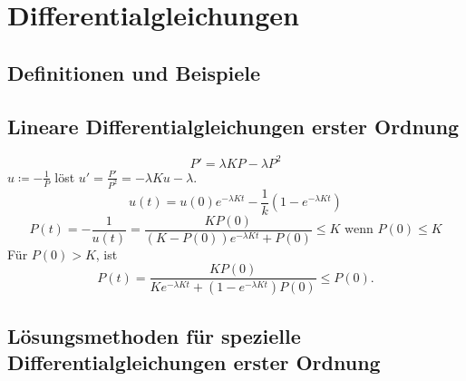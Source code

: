 \chapter{Differentialgleichungen}
\changesection
\section{Definitionen und Beispiele}
\section{Lineare Differentialgleichungen erster Ordnung}
\begin{beispiel*}
	\[ P'=\lambda KP-\lambda P^2 \]
	$ u\coloneqq-\frac{1}{P} $ l\"ost $ u'=\frac{P'}{P^2}=-\lambda Ku-\lambda $.
	\[ u(t)=u(0)e^{-\lambda Kt}-\frac{1}{k}\left(1-e^{-\lambda Kt}\right) \]
	\[ P(t)=-\frac{1}{u(t)}=\frac{KP(0)}{(K-P(0))e^{-\lambda Kt}+P(0)}\leq K\text{ wenn }P(0)\leq K \]
	F\"ur $ P(0)>K $, ist 
	\[ P(t)=\frac{KP(0)}{Ke^{-\lambda Kt}+(1-e^{-\lambda Kt})P(0)}\leq P(0). \]
\end{beispiel*}
\section{L\"osungsmethoden f\"ur spezielle Differentialgleichungen erster Ordnung}
\changesubsection
